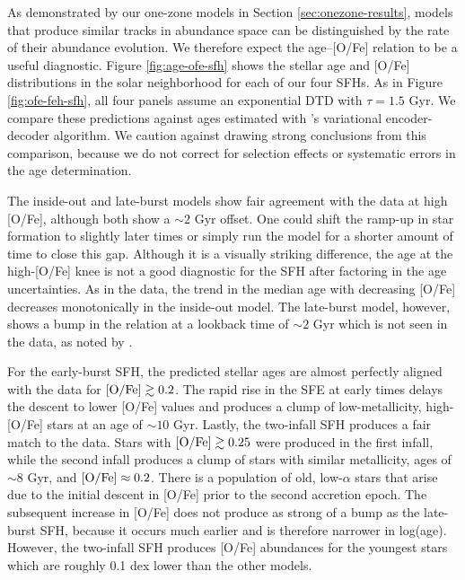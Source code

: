 \documentclass[twocolumn,twocolappendix]{aastex631}
\begin{document}
As demonstrated by our one-zone models in Section \ref{sec:onezone-results}, models that produce similar tracks in abundance space can be distinguished by the rate of their abundance evolution. We therefore expect the age--[O/Fe] relation to be a useful diagnostic. Figure \ref{fig:age-ofe-sfh} shows the stellar age and [O/Fe] distributions in the solar neighborhood for each of our four SFHs. As in Figure \ref{fig:ofe-feh-sfh}, all four panels assume an exponential DTD with $\tau=1.5$ Gyr. We compare these predictions against ages estimated with 's variational encoder-decoder algorithm. We caution against drawing strong conclusions from this comparison, because we do not correct for selection effects or systematic errors in the age determination. 

The inside-out and late-burst models show fair agreement with the data at high [O/Fe], although both show a $\sim2$ Gyr offset. One could shift the ramp-up in star formation to slightly later times or simply run the model for a shorter amount of time to close this gap. Although it is a visually striking difference, the age at the high-[O/Fe] knee is not a good diagnostic for the SFH after factoring in the age uncertainties. As in the data, the trend in the median age with decreasing [O/Fe] decreases monotonically in the inside-out model. The late-burst model, however, shows a bump in the relation at a lookback time of $\sim2$ Gyr which is not seen in the data, as noted by .

For the early-burst SFH, the predicted stellar ages are almost perfectly aligned with the data for ${\rm [O/Fe]}\gtrsim 0.2$. The rapid rise in the SFE at early times delays the descent to lower [O/Fe] values and produces a clump of low-metallicity, high-[O/Fe] stars at an age of $\sim10$ Gyr. 
Lastly, the two-infall SFH produces a fair match to the data. Stars with ${\rm [O/Fe]}\gtrsim 0.25$ were produced in the first infall, while the second infall produces a clump of stars with similar metallicity, ages of $\sim8$ Gyr, and ${\rm [O/Fe]}\approx0.2$. There is a population of old, low-$\alpha$ stars that arise due to the initial descent in [O/Fe] prior to the second accretion epoch. The subsequent increase in [O/Fe] does not produce as strong of a bump as the late-burst SFH, because it occurs much earlier and is therefore narrower in log(age). However, the two-infall SFH produces [O/Fe] abundances for the youngest stars which are roughly 0.1 dex lower than the other models.
\end{document}
